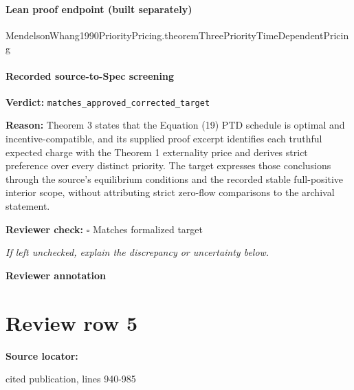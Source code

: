 \documentclass[10pt]{article}
\newcommand{\reviewerbox}{%
  \par\noindent\fbox{\parbox{0.96\linewidth}{\rule{0pt}{0.38in}}}\par
}
\newcommand{\reviewmatch}[1]{%
  \par\noindent\textbf{Reviewer check:} $\square$\; #1\par
  \noindent\emph{If left unchecked, explain the discrepancy or uncertainty below.}\par
}
\begin{document}
\paragraph{Lean proof endpoint (built separately)}\begin{ReviewVerbatim}
MendelsonWhang1990PriorityPricing.theoremThreePriorityTimeDependentPricing
\end{ReviewVerbatim}

\paragraph{Recorded source-to-Spec screening}
\textbf{Verdict:} \texttt{matches\_approved\_corrected\_target}
\\
{\raggedright
\textbf{Reason:} Theorem 3 states that the Equation (19) PTD schedule is optimal and incentive-\allowbreak{}compatible, and its supplied proof excerpt identifies each truthful expected charge with the Theorem 1 externality price and derives strict preference over every distinct priority.\allowbreak{}  The target expresses those conclusions through the source's equilibrium conditions and the recorded stable full-\allowbreak{}positive interior scope, without attributing strict zero-\allowbreak{}flow comparisons to the archival statement.\allowbreak{}
\par}
\reviewmatch{Matches formalized target}
\noindent\textbf{Reviewer annotation}\par
\reviewerbox
\clearpage
\hypertarget{source-claim-324a284201e724f2}{}
\section*{Review row 5}
\textbf{Source locator:} {\footnotesize\raggedright cited publication, lines 940-\allowbreak{}985\par}
\end{document}
